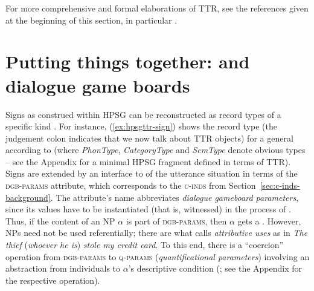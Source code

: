 \documentclass[output=paper,biblatex,babelshorthands,newtxmath,draftmode,colorlinks,citecolor=brown]{langscibook}
\begin{document}
For more comprehensive and formal elaborations of TTR, see the references given at the beginning of this section, in particular \citet{Cooper:ms}.



\section{Putting things together: \HPSGTTR and dialogue game boards}
\label{sec:hpsgttr-dialogue-game-boards}

Signs as construed within HPSG can be reconstructed as record types of a specific kind \citep{Cooper:2008}.
%
For instance, (\ref{ex:hpsgttr-sign}) shows the record type (the judgement colon indicates that we now talk about TTR objects) for a general  according to \citet{Pollard:Sag:1994} (where \emph{PhonType}, \emph{CategoryType} and \emph{SemType} denote obvious types -- see the Appendix for a minimal HPSG fragment defined in terms of TTR).
%
\ea \label{ex:hpsgttr-sign}
\z
%
Signs are extended by an interface to  of the utterance situation in terms of the \textsc{dgb-params} attribute, which corresponds to the \textsc{c-inds} from Section~\ref{sec:c-inds-background}.
%
The attribute's name abbreviates \emph{dialogue gameboard parameters}, since its values have to be instantiated (that is, witnessed) in the process of .
%
Thus, if the content of an NP $\alpha$ is part of \textsc{dgb-params}, then $\alpha$ gets a .
%
However, NPs need not be used referentially; there are what \citet{Donellan:1966} calls \emph{attributive uses} as in \emph{The thief} (\emph{whoever he is}) \emph{stole my credit card}.
%
To this end, there is a \enquote{coercion} operation from \textsc{dgb-params} to \textsc{q-params} (\emph{quantificational parameters}) involving an abstraction from individuals to $\alpha$'s descriptive condition (\citealt{Purver:Ginzburg:2004}; see the Appendix for the respective operation).
\end{document}
